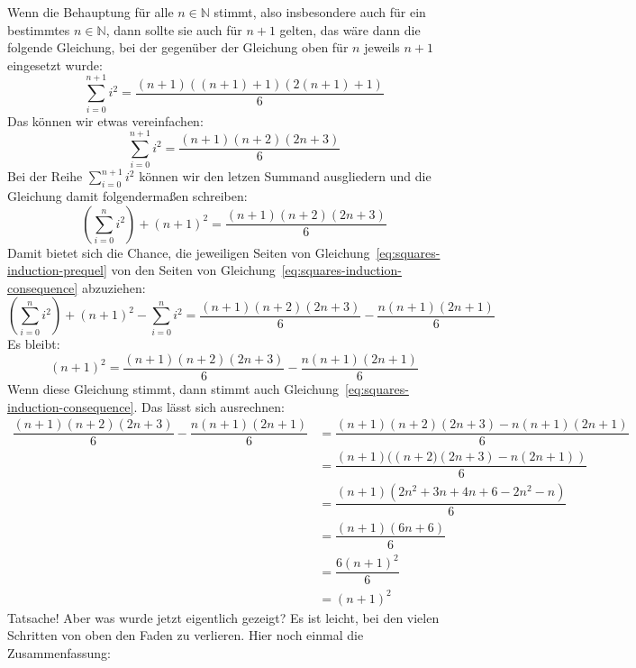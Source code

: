 Wenn die Behauptung für alle $n\in\mathbb{N}$ stimmt, also
insbesondere auch für ein bestimmtes $n\in\mathbb{N}$, dann sollte sie
auch für $n+1$ gelten, das wäre dann die folgende Gleichung, bei der
gegenüber der Gleichung oben für $n$ jeweils $n+1$ eingesetzt wurde:
%
\begin{displaymath}
  \sum_{i=0}^{n+1} i^2 = \dfrac{(n+1)((n+1)+1)(2(n+1)+1)}{6}
\end{displaymath}
%
Das können wir etwas vereinfachen:
%
\begin{equation}
  \sum_{i=0}^{n+1} i^2 = \dfrac{(n+1)(n+2)(2n+3)}{6}
  \label{eq:squares-induction-consequence}
\end{equation}
%
Bei der Reihe $\sum_{i=0}^{n+1} i^2$ können wir den letzen Summand
ausgliedern und die Gleichung damit folgendermaßen schreiben:
%
\[(\sum_{i=0}^{n}
i^2) + (n+1)^2 = \dfrac{(n+1)(n+2)(2n+3)}{6}\]
%
Damit bietet sich die Chance, die jeweiligen Seiten von
Gleichung~\ref{eq:squares-induction-prequel} von den Seiten von
Gleichung~\ref{eq:squares-induction-consequence} abzuziehen:
%
\[(\sum_{i=0}^{n}
i^2) + (n+1)^2 - \sum_{i=0}^n i^2 = \dfrac{(n+1)(n+2)(2n+3)}{6} - \dfrac{n(n+1)(2n+1)}{6}\]
%
Es bleibt:
\[ (n+1)^2 = \dfrac{(n+1)(n+2)(2n+3)}{6} - \dfrac{n(n+1)(2n+1)}{6}\]
%
Wenn diese Gleichung stimmt, dann stimmt auch
Gleichung~\ref{eq:squares-induction-consequence}.  Das lässt sich
ausrechnen:
%
\begin{displaymath}
\begin{split}
\dfrac{(n+1)(n+2)(2n+3)}{6} - \dfrac{n(n+1)(2n+1)}{6} &=
\dfrac{(n+1)(n+2)(2n+3) - n(n+1)(2n+1)}{6}\\
&= \dfrac{(n+1)(\left(n+2)(2n+3)-n(2n+1)\right)}{6}\\
&= \dfrac{(n+1)(2n^2+3n+4n+6-2n^2-n)}{6}\\
&= \dfrac{(n+1)(6n+6)}{6}\\
&= \dfrac{6(n+1)^2}{6}\\
&= (n+1)^2
\end{split}
\end{displaymath}
%
Tatsache!  Aber was wurde jetzt eigentlich gezeigt?  Es ist leicht,
bei den vielen Schritten von oben den Faden zu verlieren.  Hier noch
einmal die Zusammenfassung:


